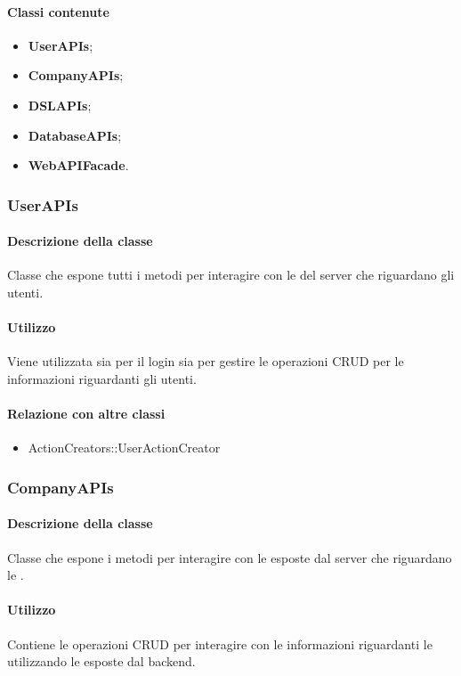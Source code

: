 \paragraph*{Classi contenute}
\begin{itemize}
\item \textbf{UserAPIs};
\item \textbf{CompanyAPIs};
\item \textbf{DSLAPIs};
\item \textbf{DatabaseAPIs};
\item \textbf{WebAPIFacade}.
\end{itemize}

\subsubsection{UserAPIs}
\paragraph*{Descrizione della classe}
Classe che espone tutti i metodi per interagire con le  del server che riguardano gli utenti.

\paragraph*{Utilizzo}
Viene utilizzata sia per il login sia per gestire le operazioni CRUD per le informazioni riguardanti gli utenti.

\paragraph*{Relazione con altre classi}
\begin{itemize}
\item ActionCreators::UserActionCreator
\end{itemize}

\subsubsection{CompanyAPIs}
\paragraph*{Descrizione della classe}
Classe che espone i metodi per interagire con le  esposte dal server che riguardano le .

\paragraph*{Utilizzo}
Contiene le operazioni CRUD per interagire con le informazioni riguardanti le  utilizzando le  esposte dal backend.

